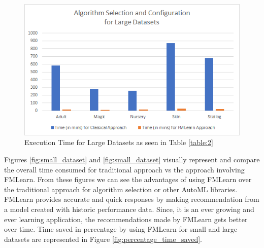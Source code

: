 \begin{figure}[H]
    \centering
    \includegraphics[width=15cm]{images/Large Datasets.png}
    \caption{Execution Time for Large Datasets as seen in Table \ref{table:2}}
    \label{fig:large_dataset}
\end{figure}

Figures \ref{fig:small_dataset} and \ref{fig:small_dataset} visually represent and compare the overall time consumed for traditional approach vs the approach involving FMLearn. From these figures we can see the advantages of using FMLearn over the traditional approach for algorithm selection or other AutoML libraries. FMLearn provides accurate and quick responses by making recommendation from a model created with historic performance data. Since, it is an ever growing and ever learning application, the recommendations made by FMLearn gets better over time. Time saved in percentage by using FMLearn for small and large datasets are represented in Figure \ref{fig:percentage_time_saved}.

